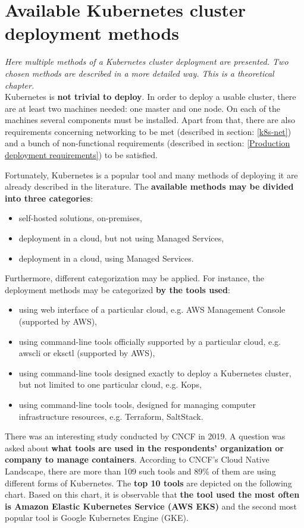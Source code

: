 \section{Available Kubernetes cluster deployment methods}
\textit{Here multiple methods of a Kubernetes cluster deployment are presented. Two chosen methods are described in a more detailed way. This is a theoretical chapter.}
\\

Kubernetes is \textbf{not trivial to deploy}. In order to deploy a usable cluster, there are at least two machines needed: one master and one node. On each of the machines several components must be installed. Apart from that, there are also requirements concerning networking to be met (described in section: \ref{k8s-net}) and a bunch of non-functional requirements (described in section: \ref{Production deployment requirements}) to be satisfied.

Fortunately, Kubernetes is a popular tool and many methods of deploying it are already described in the literature. The \textbf{available methods may be divided into three categories}:
\begin{itemize}
\item self-hosted solutions, on-premises,
\item deployment in a cloud, but not using Managed Services,
\item deployment in a cloud, using Managed Services.
\end{itemize}

Furthermore, different categorization may be applied. For instance, the deployment methods may be categorized \textbf{by the tools used}:
\begin{itemize}
\item using web interface of a particular cloud, e.g. AWS Management Console (supported by AWS),
\item using command-line tools officially supported by a particular cloud, e.g. awscli or eksctl (supported by AWS),
\item using command-line tools designed exactly to deploy a Kubernetes cluster, but not limited to one particular cloud, e.g. Kops,
\item using command-line tools tools, designed for managing computer infrastructure resources, e.g. Terraform, SaltStack.
\end{itemize}

There was an interesting study conducted by CNCF in 2019. A question was asked about \textbf{what tools are used in the respondents' organization or company to manage containers}. According to CNCF's Cloud Native Landscape, there are more than 109 such tools and 89\% of them are using different forms of Kubernetes. The \textbf{top 10 tools} are depicted on the following chart\cite{cncf-2019}. Based on this chart, it is observable that \textbf{the tool used the most often is Amazon Elastic Kubernetes Service (AWS EKS)} and the second most popular tool is Google Kubernetes Engine (GKE).

